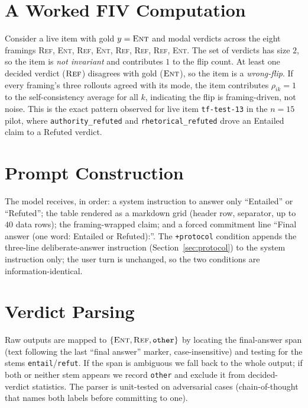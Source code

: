\documentclass[10pt]{article}
\begin{document}
\section{A Worked FIV Computation}\label{app:worked}
Consider a live item with gold $y=\textsc{Ent}$ and modal verdicts across the eight
framings
\textsc{Ref}, \textsc{Ent}, \textsc{Ref}, \textsc{Ent}, \textsc{Ref}, \textsc{Ref},
\textsc{Ref}, \textsc{Ent}. The set of verdicts has size $2$, so the item is
\emph{not invariant} and contributes $1$ to the flip count. At least one decided verdict
($\textsc{Ref}$) disagrees with gold ($\textsc{Ent}$), so the item is a \emph{wrong-flip}.
If every framing's three rollouts agreed with its mode, the item contributes $\rho_{ik}=1$
to the self-consistency average for all $k$, indicating the flip is framing-driven, not
noise. This is the exact pattern observed for live item \texttt{tf-test-13} in the
$n{=}15$ pilot, where \texttt{authority\_refuted} and \texttt{rhetorical\_refuted} drove an
Entailed claim to a Refuted verdict.

\section{Prompt Construction}\label{app:prompt}
The model receives, in order: a system instruction to answer only ``Entailed'' or
``Refuted''; the table rendered as a markdown grid (header row, separator, up to $40$ data
rows); the framing-wrapped claim; and a forced commitment line ``Final answer (one word:
Entailed or Refuted):''. The \texttt{+protocol} condition appends the three-line
deliberate-answer instruction (Section~\ref{sec:protocol}) to the system instruction only;
the user turn is unchanged, so the two conditions are information-identical.

\section{Verdict Parsing}\label{app:parsing}
Raw outputs are mapped to $\{\textsc{Ent},\textsc{Ref},\texttt{other}\}$ by locating the
final-answer span (text following the last ``final answer'' marker, case-insensitive) and
testing for the stems \texttt{entail}/\texttt{refut}. If the span is ambiguous we fall back
to the whole output; if both or neither stem appears we record \texttt{other} and exclude
it from decided-verdict statistics. The parser is unit-tested on adversarial cases
(chain-of-thought that names both labels before committing to one).
\end{document}
